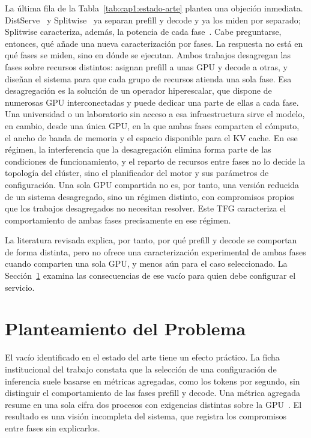 La última fila de la Tabla~\ref{tab:cap1:estado-arte} plantea una objeción inmediata. DistServe~\cite{zhong2024distserve} y Splitwise~\cite{patel2024splitwise} ya separan prefill y decode y ya los miden por separado; Splitwise caracteriza, además, la potencia de cada fase~\cite{patel2024splitwise}. Cabe preguntarse, entonces, qué añade una nueva caracterización por fases. La respuesta no está en qué fases se miden, sino en dónde se ejecutan. Ambos trabajos desagregan las fases sobre recursos distintos: asignan prefill a unas GPU y decode a otras, y diseñan el sistema para que cada grupo de recursos atienda una sola fase. Esa desagregación es la solución de un operador hiperescalar, que dispone de numerosas GPU interconectadas y puede dedicar una parte de ellas a cada fase. Una universidad o un laboratorio sin acceso a esa infraestructura sirve el modelo, en cambio, desde una única GPU, en la que ambas fases comparten el cómputo, el ancho de banda de memoria y el espacio disponible para el KV cache. En ese régimen, la interferencia que la desagregación elimina forma parte de las condiciones de funcionamiento, y el reparto de recursos entre fases no lo decide la topología del clúster, sino el planificador del motor y sus parámetros de configuración. Una sola GPU compartida no es, por tanto, una versión reducida de un sistema desagregado, sino un régimen distinto, con compromisos propios que los trabajos desagregados no necesitan resolver. Este TFG caracteriza el comportamiento de ambas fases precisamente en ese régimen.

La literatura revisada explica, por tanto, por qué prefill y decode se comportan de forma distinta, pero no ofrece una caracterización experimental de ambas fases cuando comparten una sola GPU, y menos aún para el caso seleccionado. La Sección~\ref{sec:cap1:planteamiento} examina las consecuencias de ese vacío para quien debe configurar el servicio.

\section{Planteamiento del Problema}
\label{sec:cap1:planteamiento}

El vacío identificado en el estado del arte tiene un efecto práctico. La ficha institucional del trabajo constata que la selección de una configuración de inferencia suele basarse en métricas agregadas, como los tokens por segundo, sin distinguir el comportamiento de las fases prefill y decode. Una métrica agregada resume en una sola cifra dos procesos con exigencias distintas sobre la GPU~\cite{zhong2024distserve}. El resultado es una visión incompleta del sistema, que registra los compromisos entre fases sin explicarlos.


